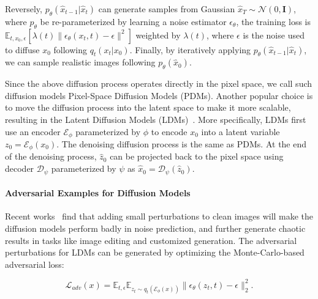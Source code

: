 \documentclass{article}
\newcommand{\chen}[1]{{\color{cyan}{#1}}}
\begin{document}
Reversely, $p_{\theta}(\hat{x}_{t-1}|\hat{x}_{t})$ can generate samples from Gaussian $\hat{x}_T \sim\mathcal{N} (0, \textbf{I})$, where $p_{\theta}$ be re-parameterized by learning a noise estimator $\epsilon_{\theta}$, the training loss is $\mathbb{E}_{t, x_0, \epsilon}[\lambda(t)\|\epsilon_{\theta}(x_t,t) - \epsilon \|^2]$ weighted by $\lambda(t)$, where $\epsilon$ is the noise used to diffuse $x_0$ following $q_t(x_t|x_0)$. Finally, by iteratively applying $p_{\theta}(\hat{x}_{t-1}|\hat{x}_{t})$, we can sample realistic images following $p_{\theta}(\hat{x}_0)$.


Since the above diffusion process operates directly in the pixel space, we call such diffusion models Pixel-Space Diffusion Models (PDMs). Another popular choice is to move the diffusion process into the latent space to make it more scalable, resulting in the Latent Diffusion Models (LDMs)~\cite{ldm}. More specifically, LDMs first use an encoder $\mathcal{E}_{\phi}$ parameterized by $\phi$ to encode $x_0$ into a latent variable $z_0 = \mathcal{E}_{\phi}(x_0)$. The denoising diffusion process is the same as PDMs. At the end of the denoising process, $\hat{z}_0$ can be projected back to the pixel space using decoder $\mathcal{D}_{\psi}$ parameterized by $\psi$ as $\hat{x}_0 = \mathcal{D}_{\psi}(\hat{z}_0)$.











\paragraph{Adversarial Examples for Diffusion Models} 
Recent works~\cite{salman2023raising, advdm} find that adding small perturbations to clean images will make the diffusion models perform badly in noise prediction, and further generate chaotic results in tasks like image editing and customized generation. The adversarial perturbations for LDMs can be generated by optimizing the Monte-Carlo-based adversarial loss:

\vspace{-0.4cm}
\begin{equation}\label{semantic_loss}
        \mathcal{L}_{adv}(x) = \mathbb{E}_{t, \epsilon} \mathbb{E}_{z_t \sim q_t(\mathcal{E}_{\phi}(x))}\|\epsilon_{\theta}(z_t, t) -\epsilon \|_2^2.
\end{equation}
\vspace{-0.4cm}
\end{document}
